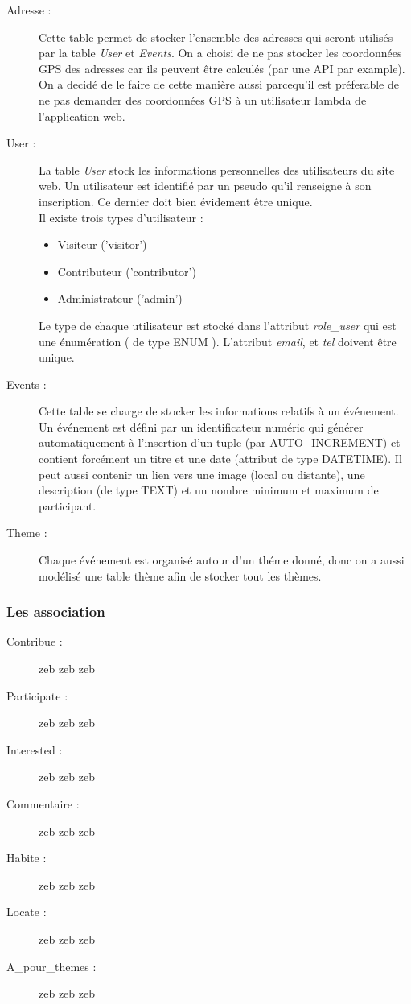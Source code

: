 \documentclass[oneside,11pt,a4paper]{article}
\begin{document}
\begin{description}
	\item[Adresse :] Cette table permet de stocker l'ensemble des adresses qui seront utilisés par la table \textit{User} et \textit{Events}. On a choisi de ne pas stocker les coordonnées GPS des adresses car ils peuvent être calculés (par une API par example). On a decidé de le faire de cette manière aussi parcequ'il est préferable de ne pas demander des coordonnées GPS à un utilisateur lambda de l'application web.
	\item[User :] La table \textit{User} stock les informations personnelles des utilisateurs du site web. Un utilisateur est identifié par un pseudo qu'il renseigne à son inscription. Ce dernier doit bien évidement être unique.\\ Il existe trois types d'utilisateur : 
	\begin{itemize}[label=\textbullet, font=\small \color{mygray}]
		\item Visiteur ('visitor')
		\item Contributeur ('contributor')
		\item Administrateur ('admin')
	\end{itemize}
	Le type de chaque utilisateur est stocké dans l'attribut \textit{role\_user} qui est une énumération ( de type ENUM ).
	L'attribut \textit{email}, et \textit{tel} doivent être unique.
	\item[Events :] Cette table se charge de stocker les informations relatifs à un événement. Un événement est défini par un identificateur numéric qui générer automatiquement à l'insertion d'un tuple (par AUTO\_INCREMENT) et contient forcément un titre et une date (attribut de type DATETIME). Il peut aussi contenir un lien vers une image (local ou distante), une description (de type TEXT) et un nombre minimum et maximum de participant.
	\item[Theme :] Chaque événement est organisé autour d'un théme donné, donc on a aussi modélisé une table thème afin de stocker tout les thèmes. 
\end{description}

\subsubsection*{Les association}

\begin{description}
	\item[Contribue : ] zeb zeb zeb \lipsum[1]
	\item[Participate : ] zeb zeb zeb \lipsum[1]
	\item[Interested : ] zeb zeb zeb \lipsum[1]
	\item[Commentaire : ] zeb zeb zeb \lipsum[1]
	\item[Habite : ] zeb zeb zeb \lipsum[1]
	\item[Locate : ] zeb zeb zeb \lipsum[1]
	\item[A\_pour\_themes : ] zeb zeb zeb \lipsum[1]
\end{description}
\end{document}
